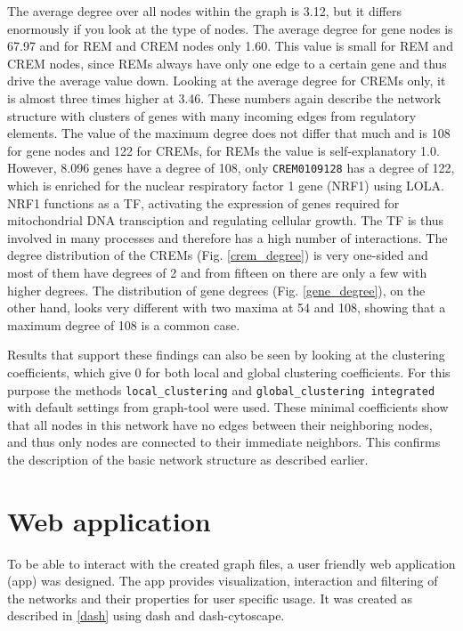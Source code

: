 \documentclass[pdftex,12pt,a4paper]{report}
\begin{document}
The average degree over all nodes within the graph is 3.12, but it differs enormously if you look at the type of nodes. The average degree for gene nodes is 67.97 and for REM and CREM nodes only 1.60. This value is small for REM and CREM nodes, since REMs always have only one edge to a certain gene and thus drive the average value down. Looking at the average degree for CREMs only, it is almost three times higher at 3.46. These numbers again describe the network structure with clusters of genes with many incoming edges from regulatory elements. The value of the maximum degree does not differ that much and is 108 for gene nodes and 122 for CREMs, for REMs the value is self-explanatory 1.0. However, 8.096 genes have a degree of 108, only \texttt{CREM0109128} has a degree of 122, which is enriched for the nuclear respiratory factor 1 gene (NRF1) using LOLA\cite{LOLA}. NRF1 functions as a TF, activating the expression of genes required for mitochondrial DNA transciption and regulating cellular growth\cite{NRF1}. The TF is thus involved in many processes and therefore has a high number of interactions.
The degree distribution of the CREMs (Fig. \ref{crem_degree}) is very one-sided and most of them have degrees of 2 and from fifteen on there are only a few with higher degrees. The distribution of gene degrees (Fig. \ref{gene_degree}), on the other hand, looks very different with two maxima at 54 and 108, showing that a maximum degree of 108 is a common case. 

Results that support these findings can also be seen by looking at the clustering coefficients, which give 0 for both local and global clustering coefficients.  For this purpose the methods \texttt{local\_clustering} and \texttt{global\_clustering integrated} with default settings from graph-tool were used. These minimal coefficients show that all nodes in this network have no edges between their neighboring nodes, and thus only nodes are connected to their immediate neighbors. This confirms the description of the basic network structure as described earlier.



\section{Web application}
To be able to interact with the created graph files, a user friendly web application (app) was designed. The app provides visualization, interaction and filtering of the networks and their properties for user specific usage. It was created as described in \ref{dash} using dash and dash-cytoscape.
\end{document}
